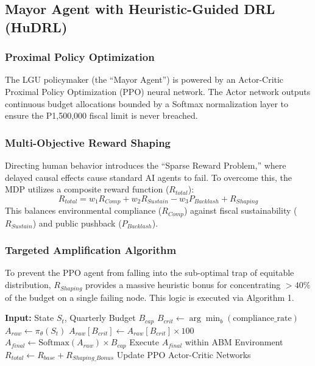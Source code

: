 \documentclass[conference,a4paper]{IEEEtran}
\begin{document}
\subsection{Mayor Agent with Heuristic-Guided DRL (HuDRL)}

\subsubsection{Proximal Policy Optimization}
The LGU policymaker (the ``Mayor Agent'') is powered by an Actor-Critic Proximal Policy Optimization (PPO) neural network. The Actor network outputs continuous budget allocations bounded by a Softmax normalization layer to ensure the P1,500,000 fiscal limit is never breached.

\subsubsection{Multi-Objective Reward Shaping}
Directing human behavior introduces the ``Sparse Reward Problem,'' where delayed causal effects cause standard AI agents to fail. To overcome this, the MDP utilizes a composite reward function ($R_{total}$):
\begin{equation}
R_{total} = w_{1}R_{Comp} + w_{2}R_{Sustain} - w_{3}P_{Backlash} + R_{Shaping}
\end{equation}
This balances environmental compliance ($R_{Comp}$) against fiscal sustainability ($R_{Sustain}$) and public pushback ($P_{Backlash}$). 

\subsubsection{Targeted Amplification Algorithm}
To prevent the PPO agent from falling into the sub-optimal trap of equitable distribution, $R_{Shaping}$ provides a massive heuristic bonus for concentrating $>40\%$ of the budget on a single failing node. This logic is executed via Algorithm 1.

\begin{algorithm}[H]
\caption{HuDRL Targeted Amplification}\label{alg:hudrl}
\begin{algorithmic}[1]
\STATE \textbf{Input:} State $S_t$, Quarterly Budget $B_{cap}$
\STATE $B_{crit} \leftarrow \arg\min_{b} (\text{compliance\_rate})$
\STATE $A_{raw} \leftarrow \pi_{\theta}(S_t)$ 
    \STATE $A_{raw}[B_{crit}] \leftarrow A_{raw}[B_{crit}] \times 100$ 
\ENDIF
\STATE $A_{final} \leftarrow \text{Softmax}(A_{raw}) \times B_{cap}$
\STATE Execute $A_{final}$ within ABM Environment
\STATE $R_{total} \leftarrow R_{base} + R_{Shaping\_Bonus}$
\STATE Update PPO Actor-Critic Networks
\end{algorithmic}
\end{algorithm}
\end{document}
